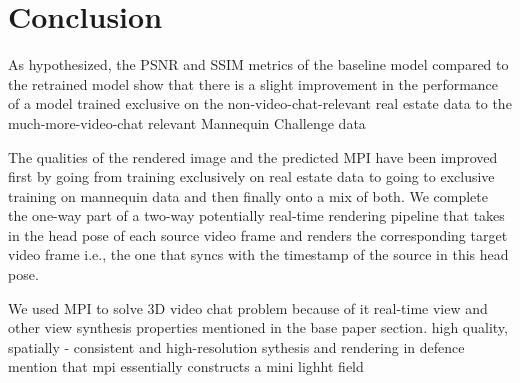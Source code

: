 \chapter{Conclusion}\label{ch:conclusion}

As hypothesized, the PSNR and SSIM metrics of the baseline model compared to the retrained model show that there is a slight improvement in the performance of a model trained exclusive on the non-video-chat-relevant real estate data to the much-more-video-chat relevant Mannequin Challenge data 

The qualities of the rendered image and the predicted MPI have been improved first by going from training exclusively on real estate data to going to exclusive training on mannequin data and then finally onto a mix of both. We complete the one-way part of a two-way potentially real-time rendering pipeline that takes in the head pose of each source video frame and renders the corresponding target video frame i.e., the one that syncs with the timestamp of the source in this head pose.

We used MPI to solve 3D video chat problem because of it real-time view and other view synthesis properties mentioned in the base paper section. high quality, spatially - consistent and high-resolution sythesis and rendering 
in defence mention that mpi essentially constructs a mini lighht field

% 